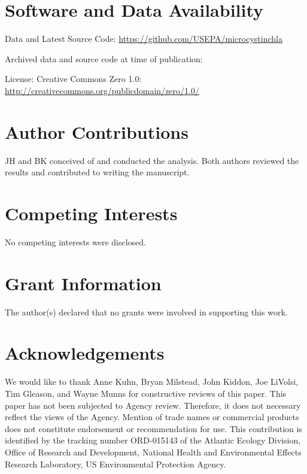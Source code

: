 \documentclass[10pt,a4paper,twocolumn]{article}
\begin{document}
\section{Software and Data
Availability}\label{software-and-data-availability}

Data and Latest Source Code:
\href{https://github.com/USEPA/microcystinchla}{\url{https://github.com/USEPA/microcystinchla}}

Archived data and source code at time of publication: \href{}{}

License: Creative Commons Zero 1.0:
\href{http://creativecommons.org/publicdomain/zero/1.0/}{\url{http://creativecommons.org/publicdomain/zero/1.0/}}

\section{Author Contributions}\label{author-contributions}

JH and BK conceived of and conducted the analysis. Both authors reviewed
the results and contributed to writing the manuscript.

\section{Competing Interests}\label{competing-interests}

No competing interests were disclosed.

\section{Grant Information}\label{grant-information}

The author(s) declared that no grants were involved in supporting this
work.

\section{Acknowledgements}\label{acknowledgements}

We would like to thank Anne Kuhn, Bryan Milstead, John Kiddon, Joe
LiVolsi, Tim Gleason, and Wayne Munns for constructive reviews of this
paper. This paper has not been subjected to Agency review. Therefore, it
does not necessary reflect the views of the Agency. Mention of trade
names or commercial products does not constitute endorsement or
recommendation for use. This contribution is identified by the tracking
number ORD-015143 of the Atlantic Ecology Division, Office of Research
and Development, National Health and Environmental Effects Research
Laboratory, US Environmental Protection Agency.
\end{document}
